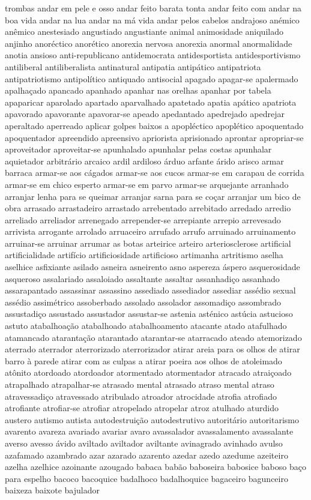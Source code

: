 \documentclass[ruledheader]{abnt_UFF}
\begin{document}
trombas andar em pele e osso andar feito barata tonta andar feito com andar na boa vida andar na lua andar na m\'{a} vida andar pelos cabelos andrajoso an\'{e}mico an\^{e}mico anestesiado angustiado angustiante animal animosidade aniquilado anjinho anor\'{e}ctico anor\'{e}tico anorexia nervosa anorexia anormal anormalidade anotia ansioso anti-republicano antidemocrata antidesportista antidesportivismo antiliberal antiliberalista antinatural antipatia antip\'{a}tico antipatriota antipatriotismo antipol\'{i}tico antiquado antisocial apagado apagar-se apalermado apalha\c{c}ado apancado apanhado apanhar nas orelhas apanhar por tabela apaparicar aparolado apartado aparvalhado apatetado apatia ap\'{a}tico apatriota apavorado apavorante apavorar-se apeado apedantado apedrejado apedrejar aperaltado aperreado aplicar golpes baixos a apopl\'{e}ctico apopl\'{e}tico apoquentado apoquentador apreendido apreensivo apriorista aprisionado aprontar apropriar-se aproveitador aproveitar-se apunhalado apunhalar pelas costas apunhalar aquietador arbitr\'{a}rio arcaico ardil ardiloso \'{a}rduo arfante \'{a}rido arisco armar barraca armar-se aos c\'{a}gados armar-se aos cucos armar-se em carapau de corrida armar-se em chico esperto armar-se em parvo armar-se arquejante arranhado arranjar lenha para se queimar arranjar sarna para se co\c{c}ar arranjar um bico de obra arrasado arrastadeiro arrastado arrebentado arrebitado arredado arredio arreliado arreliador arrenegado arrepender-se arrepiante arrepio arrevesado arrivista arrogante arrolado arruaceiro arrufado arrufo arruinado arruinamento arruinar-se arruinar arrumar as botas arteirice arteiro arteriosclerose artificial artificialidade artif\'{i}cio artificiosidade artificioso artimanha artritismo aselha aselhice asfixiante asilado asneira asneirento asno aspereza \'{a}spero asquerosidade asqueroso assalariado assaloiado assaltante assaltar assanhadi\c{c}o assanhado assarapantado assassinar assassino assediado assediador assediar ass\'{e}dio sexual ass\'{e}dio assim\'{e}trico assoberbado assolado assolador assomadi\c{c}o assombrado assustadi\c{c}o assustado assustador assustar-se astenia ast\'{e}nico ast\'{u}cia astucioso astuto atabalhoa\c{c}\~ao atabalhoado atabalhoamento atacante atado atafulhado atamancado ataranta\c{c}\~ao atarantado atarantar-se atarracado ateado atemorizado aterrado aterrador aterrorizado aterrorizador atirar areia para os olhos de atirar barro \`{a} parede atirar com as culpas a atirar poeira aos olhos de atoleimado at\^{o}nito atordoado atordoador atormentado atormentador atracado atrai\c{c}oado atrapalhado atrapalhar-se atrasado mental atrasado atraso mental atraso atravessadi\c{c}o atravessado atribulado atroador atrocidade atrofia atrofiado atrofiante atrofiar-se atrofiar atropelado atropelar atroz atulhado aturdido austero autismo autista autodestrui\c{c}\~ao autodestrutivo autorit\'{a}rio autoritarismo avarento avareza avariado avariar avaro avassalador avassalamento avassalante averso avesso \'{a}vido aviltado aviltador aviltante avinagrado avinhado avulso azafamado azambrado azar azarado azarento azedar azedo azedume azeiteiro azelha azelhice azoinante azougado babaca bab\~ao baboseira babosice baboso ba\c{c}o para espelho bacoco bacoquice badalhoco badalhoquice bagaceiro bagunceiro baixeza baixote bajulador 
\end{document}
